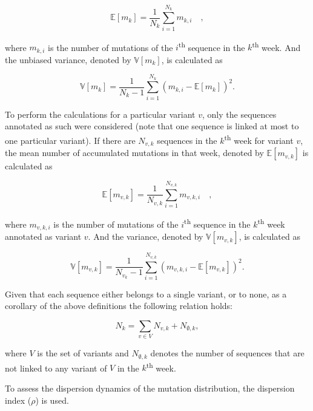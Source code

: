 \begin{equation}
    \mathbb{E}\left[m_k\right]=\frac{1}{N_k}\sum_{i=1}^{N_k}m_{k,i}\quad,
\end{equation}

\noindent where $m_{k,i}$ is the number of mutations of the $i$\textsuperscript{th} sequence in the $k$\textsuperscript{th} week. And the unbiased variance, denoted by $\mathbb{V}\left[m_k\right]$, is calculated as

\begin{equation}
    \mathbb{V}\left[m_k\right]=\frac{1}{N_k - 1}\sum_{i=1}^{N_k}\left(m_{k,i}-\mathbb{E}\left[m_k\right]\right)^2.
\end{equation}

To perform the calculations for a particular variant $v$, only the sequences annotated as such were considered (note that one sequence is linked at most to one particular variant). If there are $N_{v,k}$ sequences in the $k$\textsuperscript{th} week for variant $v$, the mean number of accumulated mutations in that week, denoted by $\mathbb{E}\left[m_{v,k}\right]$ is calculated as

\begin{equation}
    \mathbb{E}\left[m_{v,k}\right]=\frac{1}{N_{v,k}}\sum_{i=1}^{N_{v,k}}m_{v,k,i}\quad,
\end{equation}

\noindent where $m_{v,k,i}$ is the number of mutations of the $i$\textsuperscript{th} sequence in the $k$\textsuperscript{th} week annotated as variant $v$. And the variance, denoted by $\mathbb{V}\left[m_{v,k}\right]$, is calculated as

\begin{equation}
    \mathbb{V}\left[m_{v,k}\right] = \frac{1}{N_{v_k}-1}\sum_{i=1}^{N_{v,k}}\left(m_{v,k,i}-\mathbb{E}\left[m_{v,k}\right]\right)^2.
\end{equation}

Given that each sequence either belongs to a single variant, or to none, as a corollary of the above definitions the following relation holds:

\begin{equation}
    N_k=\sum_{v\in V}N_{v,k}+N_{\emptyset,k},
\end{equation}

\noindent where $V$ is the set of variants and $N_{\emptyset,k}$ denotes the number of sequences that are not linked to any variant of $V$ in the $k$\textsuperscript{th} week.

To assess the dispersion dynamics of the mutation distribution, the dispersion index ($\rho$) is used.

